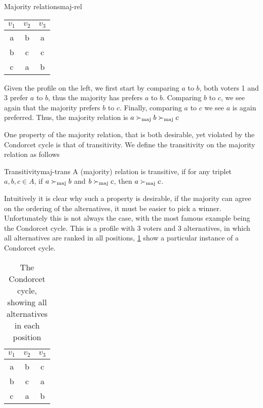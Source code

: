 \begin{example}{Majority relations}{maj-rel}
	\begin{minipage}{0.15\linewidth}
		\begin{tabular}{ccc}
			\toprule
			$v_1$ & $v_2$ & $v_3$ \\
			\midrule
			a     & b     & a     \\
			b     & c     & c     \\
			c     & a     & b     \\
			\bottomrule
		\end{tabular}
	\end{minipage}
	\hspace{2em}
	\begin{minipage}{0.70\linewidth}
		Given the profile on the left, we first start by comparing $a$ to $b$, both voters 1 and 3 prefer $a$ to $b$, thus the majority has prefers $a$ to $b$. Comparing $b$ to $c$, we see again that the majority prefers $b$ to $c$. Finally, comparing $a$ to $c$ we see $a$ is again preferred. Thus, the majority relation is $a \succ_{\text{maj}} b \succ_{\text{maj}} c$
	\end{minipage}
\end{example}

One property of the majority relation, that is both desirable, yet violated by the Condorcet cycle is that of transitivity. We define the transitivity on the majority relation as follows

\begin{definition}{Transitivity}{maj-trans}
	A (majority) relation is transitive, if for any triplet $a, b, c \in A$, if $a \succ_{\text{maj}} b$ and $b \succ_{\text{maj}} c$, then $a \succ_{\text{maj}} c$.
\end{definition}

Intuitively it is clear why such a property is desirable, if the majority can agree on the ordering of the alternatives, it must be easier to pick a winner. Unfortunately this is not always the case, with the most famous example being the Condorcet cycle. This is a profile with 3 voters and 3 alternatives, in which all alternatives are ranked in all positions, \cref{tab: Condorcet} show a particular instance of a Condorcet cycle.


\begin{table}[h]
	\centering
	\begin{tabular}{ccc}
		\toprule
		$v_1$ & $v_2$ & $v_3$ \\
		\midrule
		a     & b     & c     \\
		b     & c     & a     \\
		c     & a     & b     \\
		\bottomrule
	\end{tabular}
	\caption{The Condorcet cycle, showing all alternatives in each position}
	\label{tab: Condorcet}
\end{table}


